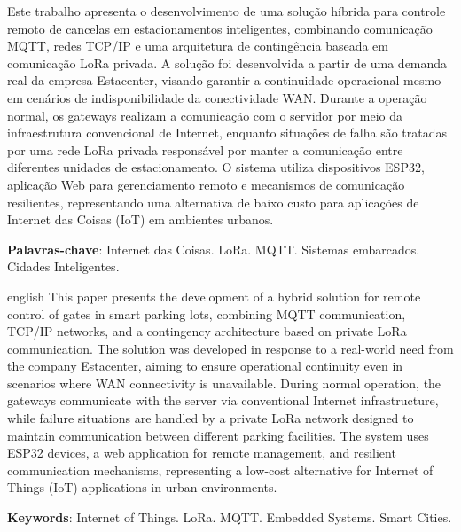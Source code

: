 \documentclass[
article,            %
11pt,               %
twoside,            %
a4paper,            %
section=TITLE,      %
onecolumn,          %
english,            %
brazil,             %
sumario=tradicional
]{abntex2}
\begin{document}
\begin{resumo}
    Este trabalho apresenta o desenvolvimento de uma solução híbrida para controle remoto de cancelas em estacionamentos inteligentes, combinando comunicação MQTT, redes TCP/IP e uma arquitetura de contingência baseada em comunicação LoRa privada. A solução foi desenvolvida a partir de uma demanda real da empresa Estacenter, visando garantir a continuidade operacional mesmo em cenários de indisponibilidade da conectividade WAN. Durante a operação normal, os gateways realizam a comunicação com o servidor por meio da infraestrutura convencional de Internet, enquanto situações de falha são tratadas por uma rede LoRa privada responsável por manter a comunicação entre diferentes unidades de estacionamento. O sistema utiliza dispositivos ESP32, aplicação Web para gerenciamento remoto e mecanismos de comunicação resilientes, representando uma alternativa de baixo custo para aplicações de Internet das Coisas (IoT) em ambientes urbanos.

    \noindent
    \textbf{Palavras-chave}: Internet das Coisas. LoRa. MQTT. Sistemas embarcados. Cidades Inteligentes.
\end{resumo}

\renewcommand{\resumoname}{Abstract}
\begin{resumo}
    \begin{otherlanguage*}{english}
    This paper presents the development of a hybrid solution for remote control of gates in smart parking lots, combining MQTT communication, TCP/IP networks, and a contingency architecture based on private LoRa communication. The solution was developed in response to a real-world need from the company Estacenter, aiming to ensure operational continuity even in scenarios where WAN connectivity is unavailable. During normal operation, the gateways communicate with the server via conventional Internet infrastructure, while failure situations are handled by a private LoRa network designed to maintain communication between different parking facilities. The system uses ESP32 devices, a web application for remote management, and resilient communication mechanisms, representing a low-cost alternative for Internet of Things (IoT) applications in urban environments.
        
    \noindent
    \textbf{Keywords}: Internet of Things. LoRa. MQTT. Embedded Systems. Smart Cities.
    \end{otherlanguage*}
\end{resumo}
\end{document}
